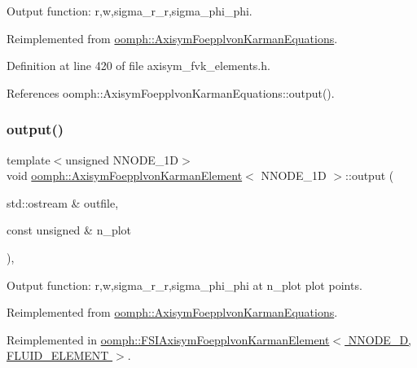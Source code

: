 Output function\+: r,w,sigma\+\_\+r\+\_\+r,sigma\+\_\+phi\+\_\+phi. 



Reimplemented from \hyperlink{classoomph_1_1AxisymFoepplvonKarmanEquations_a162b507ce3d9126a558790e77ec86e70}{oomph\+::\+Axisym\+Foepplvon\+Karman\+Equations}.



Definition at line 420 of file axisym\+\_\+fvk\+\_\+elements.\+h.



References oomph\+::\+Axisym\+Foepplvon\+Karman\+Equations\+::output().

\mbox{\label{classoomph_1_1AxisymFoepplvonKarmanElement_a435aab946dfcaa0b23e7df59e9bc3933}} 
\subsubsection{\texorpdfstring{output()}{output()}\hspace{0.1cm}{\footnotesize\ttfamily [2/8]}}
{\footnotesize\ttfamily template$<$unsigned N\+N\+O\+D\+E\+\_\+1D$>$ \\
void \hyperlink{classoomph_1_1AxisymFoepplvonKarmanElement}{oomph\+::\+Axisym\+Foepplvon\+Karman\+Element}$<$ N\+N\+O\+D\+E\+\_\+1D $>$\+::output (\begin{DoxyParamCaption}\item[{std\+::ostream \&}]{outfile,  }\item[{const unsigned \&}]{n\+\_\+plot }\end{DoxyParamCaption})\hspace{0.3cm}{\ttfamily [inline]}, {\ttfamily [virtual]}}



Output function\+: r,w,sigma\+\_\+r\+\_\+r,sigma\+\_\+phi\+\_\+phi at n\+\_\+plot plot points. 



Reimplemented from \hyperlink{classoomph_1_1AxisymFoepplvonKarmanEquations_a704051a00a2c8624edb98f3ba05e63a2}{oomph\+::\+Axisym\+Foepplvon\+Karman\+Equations}.



Reimplemented in \hyperlink{classoomph_1_1FSIAxisymFoepplvonKarmanElement_a03c82e935db8c1c93dfe2f443ec5e817}{oomph\+::\+F\+S\+I\+Axisym\+Foepplvon\+Karman\+Element$<$ N\+N\+O\+D\+E\+\_\+D, F\+L\+U\+I\+D\+\_\+\+E\+L\+E\+M\+E\+N\+T $>$}.



